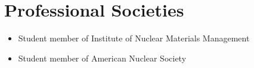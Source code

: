 \documentclass[letterpaper,11pt]{article} %
\begin{document}
\section{Professional Societies}
\begin{itemize}
    \item Student member of Institute of Nuclear Materials Management
    \item Student member of American Nuclear Society
\end{itemize}
\end{document}
